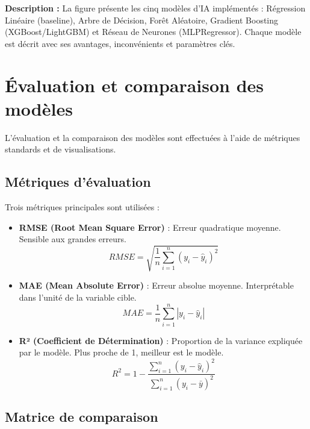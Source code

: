 \textbf{Description :} La figure présente les cinq modèles d'IA implémentés : Régression Linéaire (baseline), Arbre de Décision, Forêt Aléatoire, Gradient Boosting (XGBoost/LightGBM) et Réseau de Neurones (MLPRegressor). Chaque modèle est décrit avec ses avantages, inconvénients et paramètres clés.

\section{Évaluation et comparaison des modèles}
\label{sec:sprint5-evaluation}

L'évaluation et la comparaison des modèles sont effectuées à l'aide de métriques standards et de visualisations.

\subsection{Métriques d'évaluation}

Trois métriques principales sont utilisées :

\begin{itemize}
    \item \textbf{RMSE (Root Mean Square Error)} : Erreur quadratique moyenne. Sensible aux grandes erreurs.
    \begin{equation}
        RMSE = \sqrt{\frac{1}{n} \sum_{i=1}^{n} (y_i - \hat{y}_i)^2}
    \end{equation}
    
    \item \textbf{MAE (Mean Absolute Error)} : Erreur absolue moyenne. Interprétable dans l'unité de la variable cible.
    \begin{equation}
        MAE = \frac{1}{n} \sum_{i=1}^{n} |y_i - \hat{y}_i|
    \end{equation}
    
    \item \textbf{R² (Coefficient de Détermination)} : Proportion de la variance expliquée par le modèle. Plus proche de 1, meilleur est le modèle.
    \begin{equation}
        R^2 = 1 - \frac{\sum_{i=1}^{n} (y_i - \hat{y}_i)^2}{\sum_{i=1}^{n} (y_i - \bar{y})^2}
    \end{equation}
\end{itemize}

\subsection{Matrice de comparaison}


